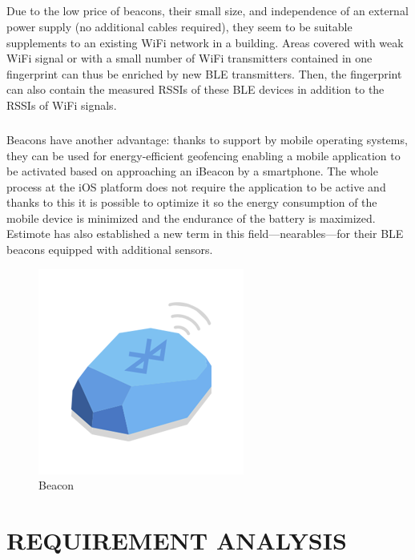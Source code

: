 \documentclass[a4paper,12pt]{report}
\begin{document}
\paragraph{}Due to the low price of beacons, their small size, and independence of an external power supply (no additional cables required), they seem to be suitable supplements to an existing WiFi network in a building. Areas covered with weak WiFi signal or with a small number of WiFi transmitters contained in one fingerprint can thus be enriched by new BLE transmitters. Then, the fingerprint can also contain the measured RSSIs of these BLE devices in addition to the RSSIs of WiFi signals.

\paragraph{}Beacons have another advantage: thanks to support by mobile operating systems, they can be used for energy-efficient geofencing enabling a mobile application to be activated based on approaching an iBeacon by a smartphone. The whole process at the iOS platform does not require the application to be active and thanks to this it is possible to optimize it so the energy consumption of the mobile device is minimized and the endurance of the battery is maximized. Estimote has also established a new term in this field—nearables—for their BLE beacons equipped with additional sensors.

\vspace{2cm}
\begin{figure}[!h]
	\begin{center}
		\includegraphics[width=.5\textwidth]{beacon.png}    
		\caption{Beacon}
		\label{fig13}
	\end{center}
\end{figure}

\renewcommand\chaptername{CHAPTER}
\chapter{REQUIREMENT ANALYSIS}
\end{document}
